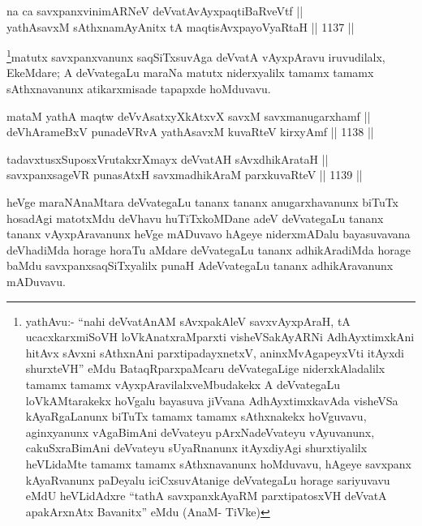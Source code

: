 \begin{shl}
na ca savxpanxvinimARNeV deVvatAvAyxpaqtiBaRveVtf || \\
yathAsavxM sAthxnamAyAnitx tA maqtisAvxpayoVyaRtaH \hfill || 1137 || 
\end{shl}

\begin{artha}
\footnote{yathAvu:- ``nahi deVvatAnAM sAvxpakAleV savxvAyxpAraH, tA ucacxkarxmiSoVH loVkAnatxraMparxti visheVSakAyARNi AdhAyxtimxkAni hitAvx sAvxni sAthxnAni parxtipadayxnetxV, aninxMvAgapeyxVti itAyxdi shurxteVH'' eMdu BataqRparxpaMcaru deVvategaLige niderxkAladalilx tamamx tamamx vAyxpAravilalxveMbudakekx A deVvategaLu loVkAMtarakekx hoVgalu bayasuva jiVvana AdhAyxtimxkavAda visheVSa kAyaRgaLanunx biTuTx tamamx tamamx sAthxnakekx hoVguvavu, aginxyanunx vAgaBimAni deVvateyu pArxNadeVvateyu vAyuvanunx, cakuSxraBimAni deVvateyu sUyaRnanunx itAyxdiyAgi shurxtiyalilx heVLidaMte tamamx tamamx sAthxnavanunx hoMduvavu, hAgeye savxpanx kAyaRvanunx paDeyalu iciCxsuvAtanige deVvategaLu horage sariyuvavu eMdU heVLidAdxre ``tathA savxpanxkAyaRM parxtipatosxVH deVvatA apakArxnAtx Bavanitx'' eMdu (AnaM- TiVke)}matutx savxpanxvanunx saqSiTxsuvAga deVvatA vAyxpAravu iruvudilalx, EkeMdare; A deVvategaLu maraNa matutx niderxyalilx tamamx tamamx sAthxnavanunx atikarxmisade tapapxde hoMduvavu.
\end{artha}


\begin{shl}
mataM yathA maqtw deVvAsatxyXkAtxvX savxM savxmanugarxhamf || \\
deVhArameBxV punadeVRvA yathAsavxM kuvaRteV kirxyAmf \hfill || 1138 ||  
\end{shl}
				
\begin{shl}
tadavxtusxSuposxVrutakxrXmayx deVvatAH sAvxdhikArataH ||  \\
savxpanxsageVR punasAtxH savxmadhikAraM parxkuvaRteV \hfill || 1139 ||  
\end{shl}

\begin{artha}
heVge maraNAnaMtara deVvategaLu tananx tananx anugarxhavanunx biTuTx hosadAgi matotxMdu deVhavu huTiTxkoMDane adeV deVvategaLu tananx tananx vAyxpAravanunx heVge mADuvavo hAgeye niderxmADalu bayasuvavana deVhadiMda horage horaTu aMdare deVvategaLu tananx adhikAradiMda horage baMdu savxpanxsaqSiTxyalilx punaH AdeVvategaLu tananx adhikAravanunx mADuvavu.
\end{artha}

